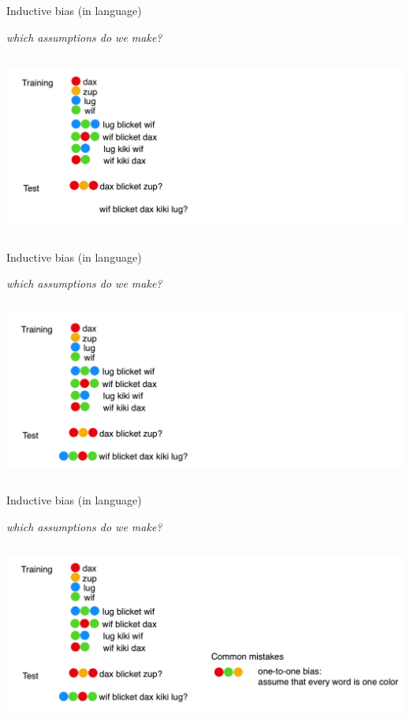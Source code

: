 \begin{frame}{Inductive bias (in language)}
\centerline{\textit{which assumptions do we make?}}
\centering\includegraphics[height=6cm]{image/img185953.jpg}

\end{frame}

\begin{frame}{Inductive bias (in language)}
\centerline{\textit{which assumptions do we make?}}
\centering\includegraphics[height=5.9cm]{image/img190213.jpg}

\end{frame}

\begin{frame}{Inductive bias (in language)}
\centerline{\textit{which assumptions do we make?}}
\centering\includegraphics[height=5.9cm]{image/img190532.jpg}

\end{frame}

